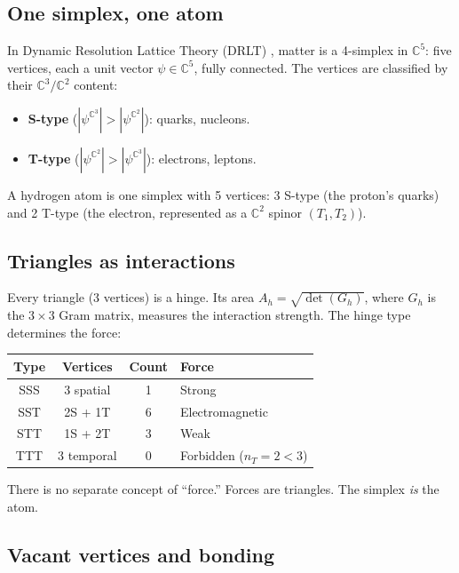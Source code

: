 \documentclass[12pt]{article}
\theoremstyle{remark}
\begin{document}
\subsection{One simplex, one atom}

In Dynamic Resolution Lattice Theory (DRLT) \cite{DRLT}, matter is a 4-simplex in $\mathbb{C}^5$: five vertices, each a unit vector $\psi \in \mathbb{C}^5$, fully connected. The vertices are classified by their $\mathbb{C}^3/\mathbb{C}^2$ content:

\begin{itemize}
\item \textbf{S-type} ($|\psi^{\mathbb{C}^3}| > |\psi^{\mathbb{C}^2}|$): quarks, nucleons.
\item \textbf{T-type} ($|\psi^{\mathbb{C}^2}| > |\psi^{\mathbb{C}^3}|$): electrons, leptons.
\end{itemize}

A hydrogen atom is one simplex with 5 vertices: 3 S-type (the proton's quarks) and 2 T-type (the electron, represented as a $\mathbb{C}^2$ spinor $(T_1, T_2)$).

\subsection{Triangles as interactions}

Every triangle (3 vertices) is a hinge. Its area $A_h = \sqrt{\det(G_h)}$, where $G_h$ is the $3 \times 3$ Gram matrix, measures the interaction strength. The hinge type determines the force:

\begin{center}
\begin{tabular}{cccl}
\hline
Type & Vertices & Count & Force \\
\hline
SSS & 3 spatial & 1 & Strong \\
SST & 2S + 1T & 6 & Electromagnetic \\
STT & 1S + 2T & 3 & Weak \\
TTT & 3 temporal & 0 & Forbidden ($n_T = 2 < 3$) \\
\hline
\end{tabular}
\end{center}

There is no separate concept of ``force.'' Forces are triangles. The simplex \emph{is} the atom.

\subsection{Vacant vertices and bonding}
\end{document}
